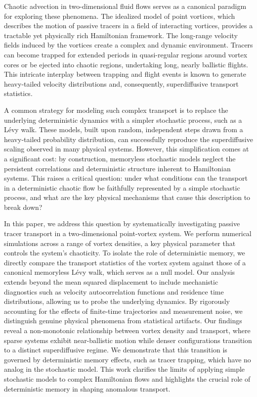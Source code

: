 \documentclass[]{article}
\begin{document}
Chaotic advection in two-dimensional fluid flows serves as a canonical paradigm for exploring these phenomena. The idealized model of point vortices, which describes the motion of passive tracers in a field of interacting vortices, provides a tractable yet physically rich Hamiltonian framework. The long-range velocity fields induced by the vortices create a complex and dynamic environment. Tracers can become trapped for extended periods in quasi-regular regions around vortex cores or be ejected into chaotic regions, undertaking long, nearly ballistic flights. This intricate interplay between trapping and flight events is known to generate heavy-tailed velocity distributions and, consequently, superdiffusive transport statistics.

A common strategy for modeling such complex transport is to replace the underlying deterministic dynamics with a simpler stochastic process, such as a Lévy walk. These models, built upon random, independent steps drawn from a heavy-tailed probability distribution, can successfully reproduce the superdiffusive scaling observed in many physical systems. However, this simplification comes at a significant cost: by construction, memoryless stochastic models neglect the persistent correlations and deterministic structure inherent to Hamiltonian systems. This raises a critical question: under what conditions can the transport in a deterministic chaotic flow be faithfully represented by a simple stochastic process, and what are the key physical mechanisms that cause this description to break down?

In this paper, we address this question by systematically investigating passive tracer transport in a two-dimensional point-vortex system. We perform numerical simulations across a range of vortex densities, a key physical parameter that controls the system's chaoticity. To isolate the role of deterministic memory, we directly compare the transport statistics of the vortex system against those of a canonical memoryless Lévy walk, which serves as a null model. Our analysis extends beyond the mean squared displacement to include mechanistic diagnostics such as velocity autocorrelation functions and residence time distributions, allowing us to probe the underlying dynamics. By rigorously accounting for the effects of finite-time trajectories and measurement noise, we distinguish genuine physical phenomena from statistical artifacts. Our findings reveal a non-monotonic relationship between vortex density and transport, where sparse systems exhibit near-ballistic motion while denser configurations transition to a distinct superdiffusive regime. We demonstrate that this transition is governed by deterministic memory effects, such as tracer trapping, which have no analog in the stochastic model. This work clarifies the limits of applying simple stochastic models to complex Hamiltonian flows and highlights the crucial role of deterministic memory in shaping anomalous transport.
\end{document}
